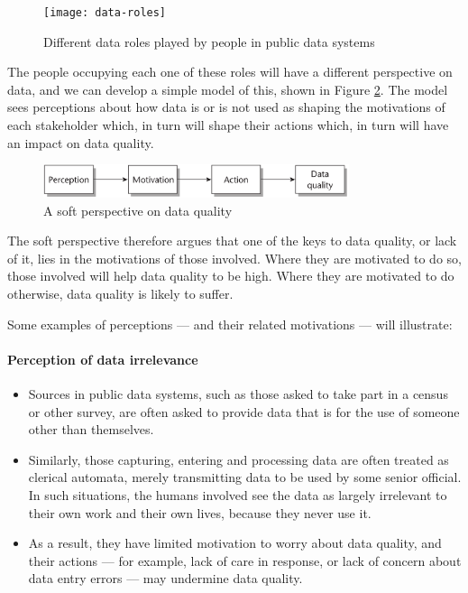 \begin{figure}[bh!]
	\centering
	\texttt{[image: data-roles]}
	\caption{Different data roles played by people in public data systems}
	\label{fig:data-roles}
\end{figure}


The people occupying each one of these roles will have a different perspective on data, and we can develop a simple model of this, shown in Figure \ref{fig:soft-perspective-on-data-quality}. The model sees perceptions about how data is or is not used as shaping the motivations of each stakeholder which, in turn will shape their actions which, in turn will have an impact on data quality.


\begin{figure}[ht!]
	\centering
	\includegraphics[width=0.8\textwidth]{graphics/soft-perspective-on-data-quality}
	\caption{A soft perspective on data quality}
	\label{fig:soft-perspective-on-data-quality}
\end{figure}

The soft perspective therefore argues that one of the keys to data quality, or lack of it, lies in the motivations of those involved. Where they are motivated to do so, those
involved will help data quality to be high. Where they are motivated to do otherwise, data quality is likely to suffer.


Some examples of perceptions — and their related motivations — will illustrate:

\paragraph*{Perception of data irrelevance}

\begin{itemize}
	\item Sources in public data systems, such as those asked to take part in a census or other survey, are often asked to provide data that is for the use of someone other than themselves. 
	\item Similarly, those capturing, entering and processing data are often treated as clerical automata, merely transmitting data to be used by some senior official. In such
	situations, the humans involved see the	data as largely irrelevant to their own work and their own lives, because they never use it. 
	\item As a result, they have limited motivation to worry about data quality, and their actions — for example, lack of care in response, or lack of concern about data entry errors — may undermine data quality.
\end{itemize}


